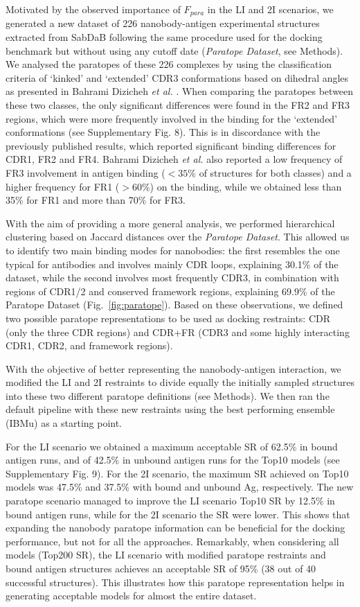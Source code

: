 \documentclass[12pt]{article}
\begin{document}
Motivated by the observed importance of $F_{para}$ in the LI and 2I scenarios, we generated a new dataset of 226 nanobody-antigen experimental structures extracted from SabDaB following the same procedure used for the docking benchmark but without using any cutoff date (\textit{Paratope Dataset}, see Methods). We analysed the paratopes of these 226 complexes by using the classification criteria of ‘kinked’ and ‘extended’ CDR3 conformations based on dihedral angles as presented in Bahrami Dizicheh \textit{et al.} \cite{bahrami2023vhh}. When comparing the paratopes between these two classes, the only significant differences were found in the FR2 and FR3 regions, which were more frequently involved in the binding for the ‘extended’ conformations (see Supplementary Fig. 8). This is in discordance with the previously published results, which reported significant binding differences for CDR1, FR2 and FR4. Bahrami Dizicheh \textit{et al.} \cite{bahrami2023vhh} also reported a low frequency of FR3 involvement in antigen binding ($<35\%$ of structures for both classes) and a higher frequency for FR1 ($>60\%$) on the binding, while we obtained less than 35\% for FR1 and more than 70\% for FR3.

With the aim of providing a more general analysis, we performed hierarchical clustering based on Jaccard distances over the \textit{Paratope Dataset}. This allowed us to identify two main binding modes for nanobodies: the first resembles the one typical for antibodies and involves mainly CDR loops, explaining 30.1\% of the dataset, while the second involves most frequently CDR3, in combination with regions of CDR1/2 and conserved framework regions, explaining 69.9\% of the Paratope Dataset (Fig.~\ref{fig:paratope}). Based on these observations, we defined two possible paratope representations to be used as docking restraints: CDR (only the three CDR regions) and CDR+FR (CDR3 and some highly interacting CDR1, CDR2, and framework regions).

With the objective of better representing the nanobody-antigen interaction, we modified the LI and 2I restraints to divide equally the initially sampled structures into these two different paratope definitions (see Methods). We then ran the default pipeline with these new restraints using the best performing ensemble (IBMu) as a starting point. 

For the LI scenario we obtained a maximum acceptable SR of 62.5\% in bound antigen runs, and of 42.5\% in unbound antigen runs for the Top10 models (see Supplementary Fig. 9). For the 2I scenario, the maximum SR achieved on Top10 models was 47.5\% and 37.5\% with bound and unbound Ag, respectively. The new paratope scenario managed to improve the LI scenario Top10 SR by 12.5\% in bound antigen runs, while for the 2I scenario the SR were lower. This shows that expanding the nanobody paratope information can be beneficial for the docking performance, but not for all the approaches. Remarkably, when considering all models (Top200 SR), the LI scenario with modified paratope restraints and bound antigen structures achieves an acceptable SR of 95\% (38 out of 40 successful structures). This illustrates how this paratope representation helps in generating acceptable models for almost the entire dataset.
\end{document}
